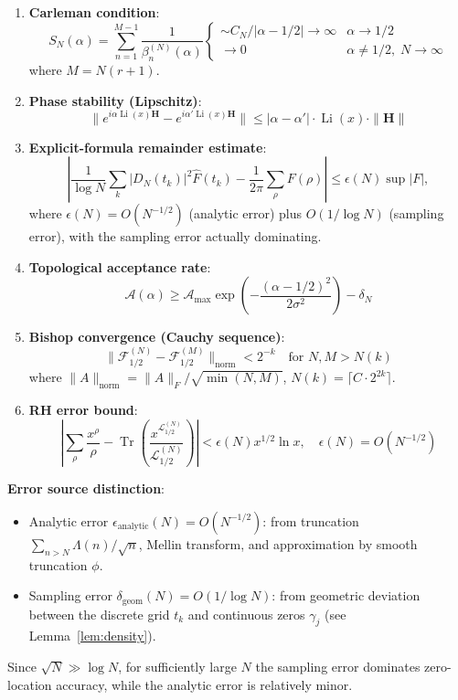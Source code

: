 \documentclass[12pt,a4paper]{amsart}
\theoremstyle{plain}
\theoremstyle{definition}
\theoremstyle{remark}
\begin{document}
\begin{enumerate}
\item \textbf{Carleman condition}:
\[
S_N(\alpha)=\sum_{n=1}^{M-1}\frac{1}{\beta_n^{(N)}(\alpha)} \begin{cases} \sim C_N/|\alpha-1/2| \to \infty & \alpha\to 1/2 \\ \to 0 & \alpha\neq 1/2,\; N\to\infty \end{cases}
\]
where $M=N(r+1)$.

\item \textbf{Phase stability (Lipschitz)}:
\[
\| e^{i\alpha\operatorname{Li}(x)\mathbf{H}} - e^{i\alpha'\operatorname{Li}(x)\mathbf{H}}\| \le |\alpha-\alpha'|\cdot\operatorname{Li}(x)\cdot\|\mathbf{H}\|
\]

\item \textbf{Explicit-formula remainder estimate}:
\[
\left| \frac{1}{\log N}\sum_{k} |D_N(t_k)|^2 \widehat{F}(t_k) - \frac{1}{2\pi}\sum_{\rho} F(\rho) \right| \le \epsilon(N) \sup|F|,
\]
where $\epsilon(N)=O(N^{-1/2})$ (analytic error) plus $O(1/\log N)$ (sampling error), with the sampling error actually dominating.

\item \textbf{Topological acceptance rate}:
\[
\mathcal{A}(\alpha) \ge \mathcal{A}_{\max}\exp\left(-\frac{(\alpha-1/2)^2}{2\sigma^2}\right)-\delta_N
\]

\item \textbf{Bishop convergence (Cauchy sequence)}:
\[
\|\mathcal{F}_{1/2}^{(N)}-\mathcal{F}_{1/2}^{(M)}\|_{\mathrm{norm}} < 2^{-k}\quad \text{for } N,M>N(k)
\]
where $\|A\|_{\mathrm{norm}} = \|A\|_F / \sqrt{\min(N,M)}$, $N(k) = \lceil C \cdot 2^{2k} \rceil$.

\item \textbf{RH error bound}:
\[
\left| \sum_\rho \frac{x^\rho}{\rho} - \operatorname{Tr}\left(\frac{x^{\mathcal{L}_{1/2}^{(N)}}}{\mathcal{L}_{1/2}^{(N)}}\right) \right| < \epsilon(N) x^{1/2}\ln x,\quad \epsilon(N)=O(N^{-1/2})
\]
\end{enumerate}

\textbf{Error source distinction}:
\begin{itemize}
\item Analytic error $\epsilon_{\text{analytic}}(N) = O(N^{-1/2})$: from truncation $\sum_{n>N} \Lambda(n)/\sqrt{n}$, Mellin transform, and approximation by smooth truncation $\phi$.
\item Sampling error $\delta_{\text{geom}}(N) = O(1/\log N)$: from geometric deviation between the discrete grid $t_k$ and continuous zeros $\gamma_j$ (see Lemma~\ref{lem:density}).
\end{itemize}
Since $\sqrt{N} \gg \log N$, for sufficiently large $N$ the sampling error dominates zero-location accuracy, while the analytic error is relatively minor.
\end{document}
